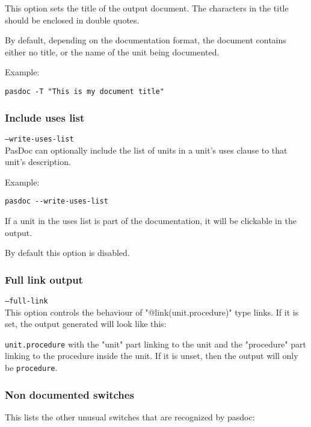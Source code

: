 \documentclass[11pt]{article}
\begin{document}
This option sets the title of the output document. 
The characters in the title should be enclosed in double quotes. 

By default, depending on the documentation format, the document 
contains either no title, or the name of the unit being documented. 

Example:
\begin{verbatim}
pasdoc -T "This is my document title"
\end{verbatim}

\subsubsection{Include uses list}

{\tt --write-uses-list}\\

PasDoc can optionally include the list of units in a unit's uses 
clause to that unit's description. 

Example:
\begin{verbatim}
pasdoc --write-uses-list
\end{verbatim}

If a unit in the uses list is part of the documentation, it 
will be clickable in the output.

By default this option is disabled.

\subsubsection{Full link output}

{\tt --full-link}\\

This option controls the behaviour of "@link(unit.procedure)" type links. 
If it is set, the output generated will look like this:

{\tt unit.procedure} with the "unit" part linking to the unit and the 
"procedure" part linking to the procedure inside the unit. If it is unset, 
then the output will only be {\tt procedure}.

\subsubsection{Non documented switches}

This lists the other unusual switches that are recognized by
pasdoc:
\end{document}
